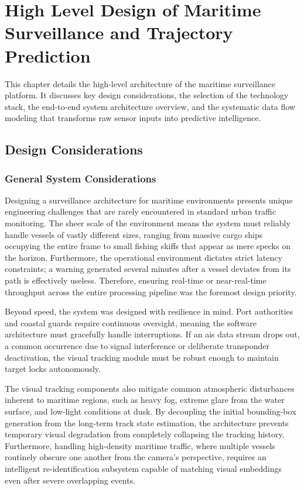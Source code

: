 \chapter{High Level Design of Maritime Surveillance and Trajectory Prediction}

This chapter details the high-level architecture of the maritime surveillance platform. It discusses key design considerations, the selection of the technology stack, the end-to-end system architecture overview, and the systematic data flow modeling that transforms raw sensor inputs into predictive intelligence.

\section{Design Considerations}

\subsection{General System Considerations}
Designing a surveillance architecture for maritime environments presents unique engineering challenges that are rarely encountered in standard urban traffic monitoring. The sheer scale of the environment means the system must reliably handle vessels of vastly different sizes, ranging from massive cargo ships occupying the entire frame to small fishing skiffs that appear as mere specks on the horizon. Furthermore, the operational environment dictates strict latency constraints; a warning generated several minutes after a vessel deviates from its path is effectively useless. Therefore, ensuring real-time or near-real-time throughput across the entire processing pipeline was the foremost design priority.

Beyond speed, the system was designed with resilience in mind. Port authorities and coastal guards require continuous oversight, meaning the software architecture must gracefully handle interruptions. If an \gls{ais} data stream drops out, a common occurrence due to signal interference or deliberate transponder deactivation, the visual tracking module must be robust enough to maintain target locks autonomously. 

The visual tracking components also mitigate common atmospheric disturbances inherent to maritime regions, such as heavy fog, extreme glare from the water surface, and low-light conditions at dusk. By decoupling the initial bounding-box generation from the long-term track state estimation, the architecture prevents temporary visual degradation from completely collapsing the tracking history. Furthermore, handling high-density maritime traffic, where multiple vessels routinely obscure one another from the camera's perspective, requires an intelligent re-identification subsystem capable of matching visual embeddings even after severe overlapping events.

